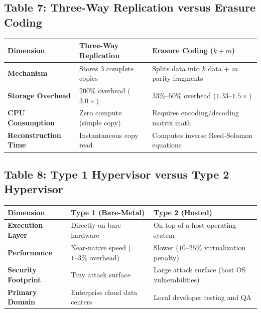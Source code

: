 \subsection*{Table 7: Three-Way Replication versus Erasure Coding}
\begin{center}
\small
\begin{tabularx}{\textwidth}{lXX}
\toprule
\textbf{Dimension} & \textbf{Three-Way Replication} & \textbf{Erasure Coding ($k+m$)} \\
\midrule
\textbf{Mechanism} & Stores 3 complete copies & Splits data into $k$ data + $m$ parity fragments \\
\textbf{Storage Overhead} & $200\%$ overhead ($3.0\times$) & $33\%\text{--}50\%$ overhead ($1.33\text{--}1.5\times$) \\
\textbf{CPU Consumption} & Zero compute (simple copy) & Requires encoding/decoding matrix math \\
\textbf{Reconstruction Time} & Instantaneous copy read & Computes inverse Reed-Solomon equations \\
\bottomrule
\end{tabularx}
\end{center}

\subsection*{Table 8: Type 1 Hypervisor versus Type 2 Hypervisor}
\begin{center}
\small
\begin{tabularx}{\textwidth}{lXX}
\toprule
\textbf{Dimension} & \textbf{Type 1 (Bare-Metal)} & \textbf{Type 2 (Hosted)} \\
\midrule
\textbf{Execution Layer} & Directly on bare hardware & On top of a host operating system \\
\textbf{Performance} & Near-native speed ($1\text{--}3\%$ overhead) & Slower ($10\text{--}25\%$ virtualization penalty) \\
\textbf{Security Footprint} & Tiny attack surface & Large attack surface (host OS vulnerabilities) \\
\textbf{Primary Domain} & Enterprise cloud data centers & Local developer testing and QA \\
\bottomrule
\end{tabularx}
\end{center}

